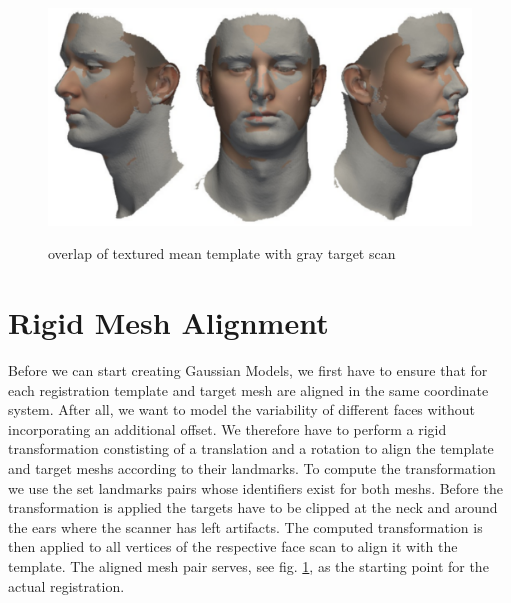 \begin{figure}[h!]
\centering
\includegraphics[width=.8\textwidth]{./resources/img/overlap_mean_target.pdf}\\
\caption{overlap of textured mean template with gray target scan}
\label{fig:overlap}
\end{figure}

\section{Rigid Mesh Alignment}
Before we can start creating Gaussian Models, we first have to ensure that for each registration template and target mesh are aligned in the same coordinate system. After all, we want to model the variability of different faces without incorporating an additional offset. We therefore have to perform a rigid transformation constisting of a translation and a rotation to align the template and target meshs according to their landmarks. To compute the transformation we use the set
landmarks pairs whose identifiers exist for both meshs. Before the transformation is applied the targets have to be clipped at the neck and around the ears where the scanner has left artifacts. The computed transformation is then applied to all vertices of the respective face scan to align it with the template. The aligned mesh pair serves, see fig. \ref{fig:overlap}, as the starting point for the actual registration.\newline
\newline

